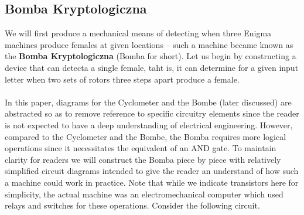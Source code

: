 \subsection{Bomba Kryptologiczna}
We will first produce a mechanical means of detecting when three
Enigma machines produce females at given locations -- such a machine
became known as the {\bf{Bomba Kryptologiczna}} (Bomba for short).
Let us begin by constructing a device that can detecta a single
female, taht is, it can determine for a given input letter when two
sets of rotors three steps apart produce a female.
\\\\In this paper, diagrams for the Cyclometer and the Bombe (later
discussed) are abstracted so as to remove reference to specific
circuitry elements since the reader is not expected to have a deep
understanding of electrical engineering. However, compared to the
Cyclometer and the Bombe, the Bomba requires more logical operations
since it necessitates the equivalent of an AND gate. To maintain
clarity for readers we will construct the Bomba piece by piece with
relatively simplified circuit diagrams intended to give the reader an
understand of how such a machine could work in practice. Note that
while we indicate transistors here for simplicity, the actual machine
was an electromechanical computer which used relays and switches for
these operations. Consider the following circuit.

